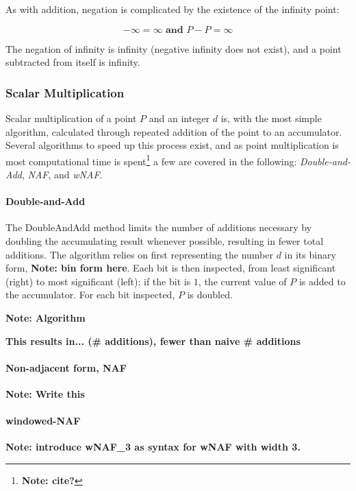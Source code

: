 As with addition, negation is complicated by the existence of the infinity point:

\begin{equation}
	-\infty = \infty \textbf{ and } P - P = \infty
\end{equation}

The negation of infinity is infinity (negative infinity does not exist), and a point subtracted from itself is infinity.\cite{hankerson2010}

\subsubsection{Scalar Multiplication}

Scalar multiplication of a point \(P\) and an integer \(d\) is, with the most simple algorithm, calculated through repeated addition
of the point to an accumulator. Several algorithms to speed up this process exist, and as point multiplication is most computational
time is spent\footnote{\textbf{Note: cite?}} a few are covered in the following: \emph{Double-and-Add}, \emph{NAF}, and \emph{wNAF}.

\paragraph{Double-and-Add}

The DoubleAndAdd method limits the number of additions necessary by doubling the accumulating result whenever possible, resulting in
fewer total additions. The algorithm relies on first representing the number \(d\) in its binary form, \textbf{Note: bin form here}.
Each bit is then inspected, from least significant (right) to most significant (left): if the bit is \(1\), the current value of \(P\)
is added to the accumulator. For each bit inspected, \(P\) is doubled.

\textbf{Note: Algorithm}

\textbf{This results in... (\# additions), fewer than naive \# additions}

\paragraph{Non-adjacent form, NAF}

\textbf{Note: Write this}

\paragraph{windowed-NAF}

\textbf{Note: introduce wNAF\_3 as syntax for wNAF with width 3.}